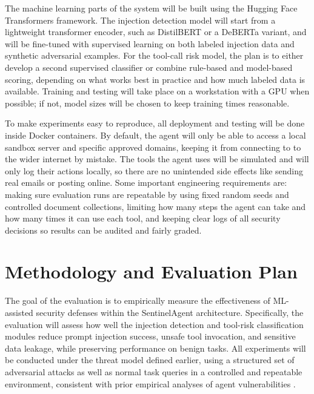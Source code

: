 \documentclass[11pt]{article}
\begin{document}
The machine learning parts of the system will be built using the Hugging Face Transformers framework. The injection detection model will start from a lightweight transformer encoder, such as DistilBERT or a DeBERTa variant, and will be fine-tuned with supervised learning on both labeled injection data and synthetic adversarial examples. For the tool-call risk model, the plan is to either develop a second supervised classifier or combine rule-based and model-based scoring, depending on what works best in practice and how much labeled data is available. Training and testing will take place on a workstation with a GPU when possible; if not, model sizes will be chosen to keep training times reasonable.

To make experiments easy to reproduce, all deployment and testing will be done inside Docker containers. By default, the agent will only be able to access a local sandbox server and specific approved domains, keeping it from connecting to to the wider internet by mistake. The tools the agent uses will be simulated and will only log their actions locally, so there are no unintended side effects like sending real emails or posting online. Some important engineering requirements are: making sure evaluation runs are repeatable by using fixed random seeds and controlled document collections, limiting how many steps the agent can take and how many times it can use each tool, and keeping clear logs of all security decisions so results can be audited and fairly graded.
\section{Methodology and Evaluation Plan}

The goal of the evaluation is to empirically measure the effectiveness of ML-assisted security defenses within the SentinelAgent architecture. Specifically, the evaluation will assess how well the injection detection and tool-risk classification modules reduce prompt injection success, unsafe tool invocation, and sensitive data leakage, while preserving performance on benign tasks. All experiments will be conducted under the threat model defined earlier, using a structured set of adversarial attacks as well as normal task queries in a controlled and repeatable environment, consistent with prior empirical analyses of agent vulnerabilities \cite{greshake2023prompt, deng2025agentsurvey}.
\end{document}
